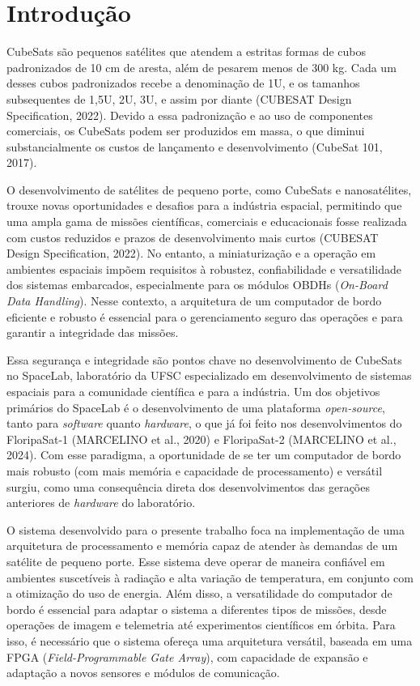 \chapter{Introdução}
\label{Chap:intro}

CubeSats são pequenos satélites que atendem a estritas formas de cubos padronizados de 10 cm de aresta, além de pesarem menos de 300 kg. Cada um desses cubos padronizados recebe a denominação de 1U, e os tamanhos subsequentes de 1,5U, 2U, 3U, e assim por diante (CUBESAT Design Specification, 2022). Devido a essa padronização e ao uso de componentes comerciais, os CubeSats podem ser produzidos em massa, o que diminui substancialmente os custos de lançamento e desenvolvimento (CubeSat 101, 2017).

O desenvolvimento de satélites de pequeno porte, como CubeSats e nanosatélites, trouxe novas oportunidades e desafios para a indústria espacial, permitindo que uma ampla gama de missões científicas, comerciais e educacionais fosse realizada com custos reduzidos e prazos de desenvolvimento mais curtos (CUBESAT Design Specification, 2022). No entanto, a miniaturização e a operação em ambientes espaciais impõem requisitos à robustez, confiabilidade e versatilidade dos sistemas embarcados, especialmente para os módulos OBDHs (\textit{On-Board Data Handling}). Nesse contexto, a arquitetura de um computador de bordo eficiente e robusto é essencial para o gerenciamento seguro das operações e para garantir a integridade das missões.

Essa segurança e integridade são pontos chave no desenvolvimento de CubeSats no SpaceLab, laboratório da UFSC especializado em desenvolvimento de sistemas espaciais para a comunidade científica e para a indústria. Um dos objetivos primários do SpaceLab é o desenvolvimento de uma plataforma \textit{open-source}, tanto para \textit{software} quanto \textit{hardware}, o que já foi feito nos desenvolvimentos do FloripaSat-1 (MARCELINO et al., 2020) e FloripaSat-2 (MARCELINO et al., 2024). Com esse paradigma, a oportunidade de se ter um computador de bordo mais robusto (com mais memória e capacidade de processamento) e versátil surgiu, como uma consequência direta dos desenvolvimentos das gerações anteriores de \textit{hardware} do laboratório.

O sistema desenvolvido para o presente trabalho foca na implementação de uma arquitetura de processamento e memória capaz de atender às demandas de um satélite de pequeno porte. Esse sistema deve operar de maneira confiável em ambientes suscetíveis à radiação e alta variação de temperatura, em conjunto com a otimização do uso de energia. Além disso, a versatilidade do computador de bordo é essencial para adaptar o sistema a diferentes tipos de missões, desde operações de imagem e telemetria até experimentos científicos em órbita. Para isso, é necessário que o sistema ofereça uma arquitetura versátil, baseada em uma FPGA (\textit{Field-Programmable Gate Array}), com capacidade de expansão e adaptação a novos sensores e módulos de comunicação.

